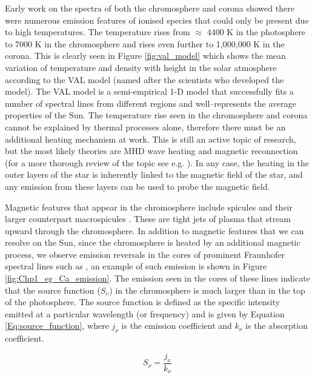 Early work on the spectra of both the chromosphere and corona showed there were numerous emission features of ionised species that could only be present due to high temperatures. The temperature rises from $\approx$ 4400 K in the photosphere to 7000 K in the chromosphere and rises even further to 1,000,000 K in the corona. This is clearly seen in Figure \ref{fig:val_model} which shows the mean variation of temperature and density with height in the solar atmosphere according to the VAL model (named after the scientists who developed the model). The VAL model \citep{Vernazza_etal_1981} is a semi-empirical 1-D model that successfully fits a number of spectral lines from different regions and well--represents the average properties of the Sun. The temperature rise seen in the chromosphere and corona cannot be explained by thermal processes alone, therefore there must be an additional heating mechanism at work. This is still an active topic of research, but the most likely theories are MHD wave heating and magnetic reconnection (for a more thorough review of the topic see e.g. \citealt{Parnell_DeMoortel_2012}). In any case, the heating in the outer layers of the star is inherently linked to the magnetic field of the star, and any emission from these layers can be used to probe the magnetic field.

Magnetic features that appear in the chromosphere include spicules \citep{Roberts_1945} and their larger counterpart macrospicules \citep{Bohlin_etal_1975}. These are tight jets of plasma that stream upward through the chromosphere. In addition to magnetic features that we can resolve on the Sun, since the chromosphere is heated by an additional magnetic process, we observe emission reversals in the cores of prominent Fraunhofer spectral lines such as \caII, an example of such emission is shown in Figure \ref{fig:Chp1_eg_Ca_emission}. The emission seen in the cores of these lines indicate that the source function ($S_{\upsilon}$) in the chromosphere is much larger than in the top of the photosphere. The source function is defined as the specific intensity emitted at a particular wavelength (or frequency) and is given by Equation \ref{Eq:source_function}, where $j_{\nu}$ is the emission coefficient and $k_{\nu}$ is the absorption coefficient.

\begin{equation}
    S_{\nu} = \frac{j_{\nu}}{k_{\nu}}
    \label{Eq:source_function}
\end{equation}

